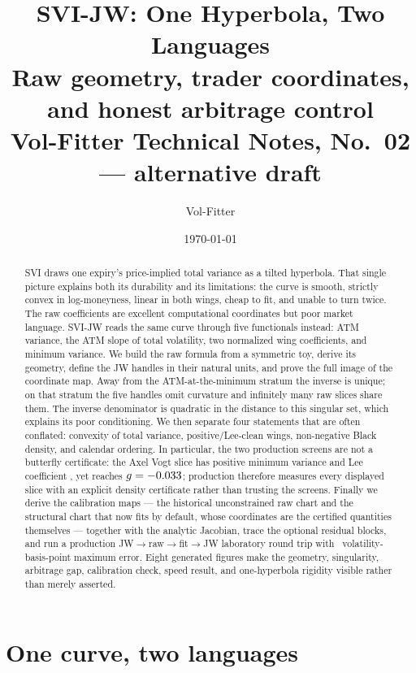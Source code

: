 \documentclass[11pt]{article}
\title{\textbf{SVI-JW: One Hyperbola, Two Languages}\\[2pt]
\large Raw geometry, trader coordinates, and honest arbitrage control\\[2pt]
\normalsize Vol-Fitter Technical Notes, No.~02 --- alternative draft}
\author{Vol-Fitter}
\date{\today}
\begin{document}
\maketitle


\begin{abstract}
SVI draws one expiry's price-implied total variance as a tilted hyperbola.  That
single picture explains both its durability and its limitations: the curve is
smooth, strictly convex in log-moneyness, linear in both wings, cheap to fit,
and unable to turn twice.  The raw coefficients are excellent computational
coordinates but poor market language.  SVI-JW reads the same curve through five
functionals instead: ATM variance, the ATM slope of total volatility, two
normalized wing coefficients, and minimum variance.  We build the raw formula
from a symmetric toy, derive its geometry, define the JW handles in their
natural units, and prove the full image of the coordinate map.  Away from the
ATM-at-the-minimum stratum the inverse is unique; on that stratum the five
handles omit curvature and infinitely many raw slices share them.  The inverse
denominator is quadratic in the distance to this singular set, which explains
its poor conditioning.  We then separate four statements that are often
conflated: convexity of total variance, positive/Lee-clean wings, non-negative
Black density, and calendar ordering.  In particular, the two production
screens are not a butterfly certificate: the Axel Vogt slice has positive
minimum variance and Lee coefficient \svirwcounterlee, yet reaches
$g=-0.033$; production therefore measures every displayed slice with
an explicit density certificate rather than trusting the screens.  Finally we
derive the calibration maps --- the historical unconstrained raw chart and the
structural chart that now fits by default, whose coordinates are the certified
quantities themselves --- together with the analytic Jacobian, trace the
optional residual blocks, and run a production
JW$\to$raw$\to$fit$\to$JW laboratory round trip with
\svirwmaxerr\ volatility-basis-point maximum error.  Eight generated figures
make the geometry, singularity, arbitrage gap, calibration check, speed result,
and one-hyperbola rigidity visible rather than merely asserted.
\end{abstract}

\clearpage
\tableofcontents
\clearpage

\section{One curve, two languages}
\label{sec:rw_problem}
\end{document}
